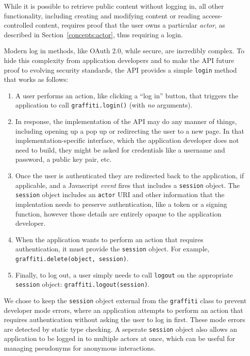 While it is possible to retrieve public content without logging in,
all other functionality, including
creating and modifying content or reading access-controlled content,
requires proof that the user owns a particular \emph{actor},
as described in Section~\ref{concepts:actor}, thus requiring a login.

Modern log in methods, like OAuth 2.0, while secure, are incredibly complex.
To hide this complexity from application developers and to make the API future proof
to evolving security standards, the API provides a simple \texttt{login} method that works as follows:

\begin{enumerate}
\item
A user performs an action, like clicking a ``log in'' button, that triggers
the application to call \texttt{graffiti.login()} (with \emph{no} arguments).
\item
In response, the implementation of the API may do any manner of things,
including opening up a pop up or redirecting the user to a new page.
In that implementation-specific interface, which the application developer
does not need to build, they might be asked for credentials like a username
and password, a public key pair, etc.
\item
Once the user is authenticated they are redirected back to the application, if applicable,
and a Javascript \emph{event} fires that includes
a \texttt{session} object. The \texttt{session} object includes an \texttt{actor}
URI and other information that the implentation needs to preserve authentication, like
a token or a signing function, however those details are entirely opaque to the application developer.
\item
When the application wants to perform an action that requires authentication,
it must provide the \texttt{session} object. For example,
\texttt{graffiti.delete(object, session)}.
\item
Finally, to log out, a user simply needs to call \texttt{logout} on the appropriate
\texttt{session} object: \texttt{graffiti.logout(session)}.
\end{enumerate}

We chose to keep the \texttt{session} object external from the \texttt{graffiti} class
to prevent developer mode errors, where an application attempts to perform an action
that requires authentication without asking the user to log in first.
These mode errors are detected by static type checking.
A seperate \texttt{session} object also allows an application to be logged in to
multiple actors at once, which can be useful for managing pseudonyms for anonymous interactions.

